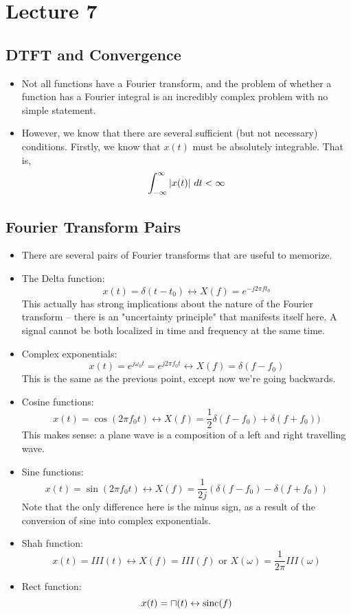 \section{Lecture 7}
\subsection{DTFT and Convergence}
\begin{itemize}
	\item Not all functions have a Fourier transform, and the problem of whether a function has a Fourier 
		integral is an incredibly complex problem with no simple statement. 
	\item However, we know that there are several sufficient (but not necessary) conditions. Firstly, 
		we know that \( x(t) \) must be absolutely integrable. That is, 
		\[
		\int_{-\infty}^{\infty} |x(t)| \ d t < \infty
		\] 
\end{itemize}
\subsection{Fourier Transform Pairs}
\begin{itemize}
	\item There are several pairs of Fourier transforms that are useful to memorize.
	\item The Delta function:
		\[
			x(t) = \delta(t - t_0) \leftrightarrow X(f) = e^{-j 2\pi ft_0}
		\]
		This actually has strong implications about the nature of the Fourier transform -- there is an 
		"uncertainty principle" that manifests itself here. A signal cannot be both localized in time and frequency at
		the same time.
	\item Complex exponentials:
		\[
		x(t) = e^{j \omega_0 t} = e^{j 2 \pi f_0 t} \leftrightarrow X(f) = \delta(f - f_0)
		\] 
		This is the same as the previous point, except now we're going backwards.   
	\item Cosine functions:
		\[
		x(t) = \cos(2 \pi f_0 t) \leftrightarrow X(f) = \frac{1}{2}\delta(f - f_0) + \delta(f + f_0))
		\] 
		This makes sense: a plane wave is a composition of a left and right travelling wave.  
	\item Sine functions:
		\[
		x(t) = \sin(2 \pi f_0 t) \leftrightarrow X(f) = \frac{1}{2j}(\delta(f - f_0) - \delta(f + f_0))
		\] 
		Note that the only difference here is the minus sign, as a result of the conversion of sine into 
		complex exponentials.
	\item Shah function:
		\[
		x(t) = III(t) \leftrightarrow X(f) = III(f) \text{ or } X(\omega) = \frac{1}{2\pi}III(\omega)
		\] 
	\item Rect function:
		\[
		x(t) = \sqcap(t) \leftrightarrow \mathrm{sinc}(f)
		\] 
\end{itemize}

